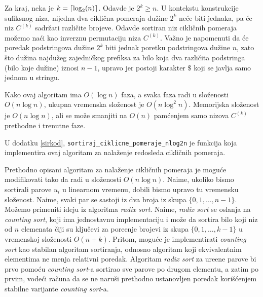 Za kraj, neka je $k = \left \lceil \log_2(n) \right \rceil$. Odavde je $2^k \geq n$. U kontekstu konstrukcije sufiksnog niza, nijedna dva cikli\v cna pomeraja du\v zine $2^k$ ne\' ce biti jednaka, pa \' ce niz $C^{(k)}$ sadr\v zati razli\v cite brojeve. Odavde sortiran niz cikli\v cnih pomeraja mo\v zemo na\' ci kao inverznu permutaciju niza $C^{(k)}$. Va\v zno je napomenuti da \' ce poredak podstringova du\v zine $2^k$ biti jednak poretku podstringova du\v zine $n$, zato \v sto du\v zina najdu\v zeg zajedni\v ckog prefiksa za bilo koja dva razli\v cita podstringa (bilo koje du\v zine) iznosi $n-1$, upravo jer postoji karakter $\$$ koji se javlja samo jednom u stringu.

Kako ovaj algoritam ima $O(\log n)$ faza, a svaka faza radi u slo\v zenosti $O(n \log n)$, ukupna vremenska slo\v zenost je $O(n \log^2 n)$. Memorijska slo\v zenost je $O(n \log n)$, ali se mo\v ze smanjiti na $O(n)$ pam\' cenjem samo nizova $C^{(k)}$ prethodne i trenutne faze.

U dodatku \ref{sirkod}, \texttt{sortiraj\_ciklicne\_pomeraje\_nlog2n} je funkcija koja implementira ovaj algoritam za nala\v zenje redosleda cikli\v cnih pomeraja.


Prethodno opisani algoritam za nala\v zenje cikli\v cnih pomeraja je mogu\' ce modifikovati tako da radi u slo\v zenosti $O(n \log n)$. Naime, ukoliko bismo sortirali parove $u_i$ u linearnom vremenu, dobili bismo upravo tu vremensku slo\v zenost. Naime, svaki par se sastoji iz dva broja iz skupa $\{0, 1, \ldots, n-1\}$. Mo\v zemo primeniti ideju iz algoritma \textit{radix sort}. Naime, \textit{radix sort} se oslanja na \textit{counting sort}, koji ima jednostavnu implementaciju i mo\v ze da sortira bilo koji niz od $n$ elemenata \v ciji su klju\v cevi za pore\dj enje brojevi iz skupa $\{0, 1, \ldots, k-1\}$ u vremenskoj slo\v zenosti $O(n+k)$. Pritom, mogu\' ce je implementirati \textit{counting sort} kao stabilan algoritam sortiranja, odnosno algoritam koji ekvivalentnim elementima ne menja relativni poredak. Algoritam \textit{radix sort} za ure\dj ene parove bi prvo pomo\' cu \textit{counting sort}-a sortirao sve parove po drugom elementu, a zatim po prvim, vode\' ci ra\v cuna da se ne naru\v si prethodno ustanovljen poredak kori\v s\' cenjem stabilne varijante \textit{counting sort}-a.

